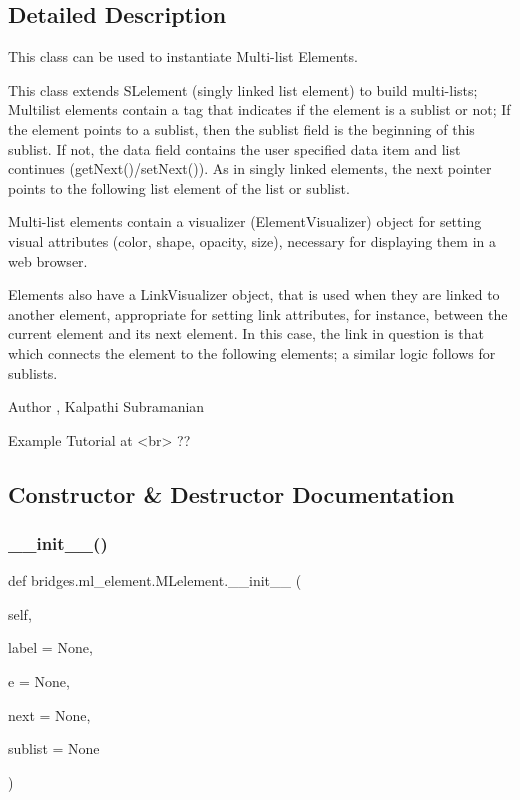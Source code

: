 \subsection{Detailed Description}
This class can be used to instantiate Multi-\/list Elements. 

This class extends S\+Lelement (singly linked list element) to build multi-\/lists; Multilist elements contain a tag that indicates if the element is a sublist or not; If the element points to a sublist, then the sublist field is the beginning of this sublist. If not, the data field contains the user specified data item and list continues (get\+Next()/set\+Next()). As in singly linked elements, the next pointer points to the following list element of the list or sublist.

Multi-\/list elements contain a visualizer (Element\+Visualizer) object for setting visual attributes (color, shape, opacity, size), necessary for displaying them in a web browser.

Elements also have a Link\+Visualizer object, that is used when they are linked to another element, appropriate for setting link attributes, for instance, between the current element and its next element. In this case, the link in question is that which connects the element to the following elements; a similar logic follows for sublists.

\begin{DoxyAuthor}{Author}
, Kalpathi Subramanian
\end{DoxyAuthor}
\begin{DoxyVerb}\sa Example Tutorial at <br> ??\end{DoxyVerb}
 

\subsection{Constructor \& Destructor Documentation}
\mbox{\label{classbridges_1_1ml__element_1_1_m_lelement_a079043b0d070583b38881b663fb2e595}} 
\subsubsection{\texorpdfstring{\+\_\+\+\_\+init\+\_\+\+\_\+()}{\_\_init\_\_()}}
{\footnotesize\ttfamily def bridges.\+ml\+\_\+element.\+M\+Lelement.\+\_\+\+\_\+init\+\_\+\+\_\+ (\begin{DoxyParamCaption}\item[{}]{self,  }\item[{}]{label = {\ttfamily None},  }\item[{}]{e = {\ttfamily None},  }\item[{}]{next = {\ttfamily None},  }\item[{}]{sublist = {\ttfamily None} }\end{DoxyParamCaption})}



